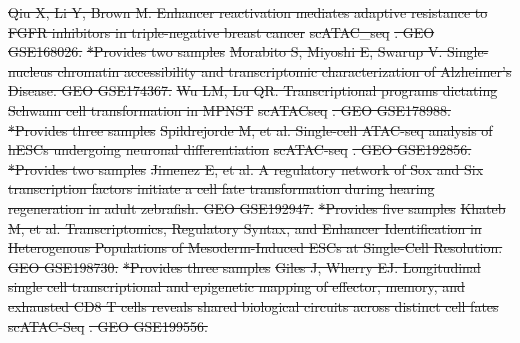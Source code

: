 \documentclass[referee, pdflatex, sn-vancouver-num]{sn-jnl}
\providecommand{\DIFdeltex}[1]{{\protect\color{red}\sout{#1}}}                      %
\providecommand{\DIFdelbegin}{} %
\providecommand{\DIFdel}[1]{\texorpdfstring{\DIFdeltex{#1}}{}} %
\newcommand{\DIFscaledelfig}{0.5}
\newlength{\DIFdelgraphicswidth} %
\newlength{\DIFdelgraphicsheight} %
\newcommand{\DIFdelincludegraphics}[2][]{%
\sbox{\DIFdelgraphicsbox}{\DIFOincludegraphics[#1]{#2}}%
\settoboxwidth{\DIFdelgraphicswidth}{\DIFdelgraphicsbox} %
\settoboxtotalheight{\DIFdelgraphicsheight}{\DIFdelgraphicsbox} %
\scalebox{\DIFscaledelfig}{%
\parbox[b]{\DIFdelgraphicswidth}{\usebox{\DIFdelgraphicsbox}\\[-\baselineskip] \rule{\DIFdelgraphicswidth}{0em}}\llap{\resizebox{\DIFdelgraphicswidth}{\DIFdelgraphicsheight}{%
\setlength{\unitlength}{\DIFdelgraphicswidth}%
\begin{picture}(1,1)%
\thicklines\linethickness{2pt} %
{\color[rgb]{1,0,0}\put(0,0){\framebox(1,1){}}}%
{\color[rgb]{1,0,0}\put(0,0){\line( 1,1){1}}}%
{\color[rgb]{1,0,0}\put(0,1){\line(1,-1){1}}}%
\end{picture}%
}\hspace*{3pt}}} %
} %
\DeclareRobustCommand{\DIFdelbegin}{\DIFOdelbegin \let\includegraphics\DIFdelincludegraphics} %
\begin{document}
\begin{appendices}
\DIFdelbegin %
\DIFdel{Qiu X, Li Y, Brown M. Enhancer reactivation mediates adaptive resistance to FGFR inhibitors in triple-negative breast cancer }%
\DIFdel{scATAC\_seq}%
\DIFdel{. GEO GSE168026. }%
\DIFdel{*Provides two samples
	}%
\DIFdel{Morabito S, Miyoshi E, Swarup V. Single-nucleus chromatin accessibility and transcriptomic characterization of Alzheimer's Disease. GEO GSE174367. }%
\DIFdel{Wu LM, Lu QR. Transcriptional programs dictating Schwann cell transformation in MPNST }%
\DIFdel{scATACseq}%
\DIFdel{. GEO GSE178988. }%
\DIFdel{*Provides three samples
	}%
\DIFdel{Spildrejorde M, et al. Single-cell ATAC-seq analysis of hESCs undergoing neuronal differentiation }%
\DIFdel{scATAC-seq}%
\DIFdel{. GEO GSE192856. }%
\DIFdel{*Provides two samples
	}%
\DIFdel{Jimenez E, et al. A regulatory network of Sox and Six transcription factors initiate a cell fate transformation during hearing regeneration in adult zebrafish. GEO GSE192947. }%
\DIFdel{*Provides five samples
	}%
\DIFdel{Khateb M, et al. Transcriptomics, Regulatory Syntax, and Enhancer Identification in Heterogenous Populations of Mesoderm-Induced ESCs at Single-Cell Resolution. GEO GSE198730. }%
\DIFdel{*Provides three samples
	}%
\DIFdel{Giles J, Wherry EJ. Longitudinal single cell transcriptional and epigenetic mapping of effector, memory, and exhausted CD8 T cells reveals shared biological circuits across distinct cell fates }%
\DIFdel{scATAC-Seq}%
\DIFdel{. GEO GSE199556. }%

\end{appendices}
\end{document}
